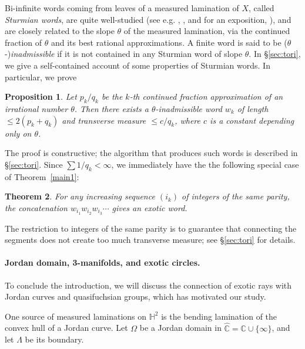 \documentclass[11pt]{article} %
\theoremstyle{plain}
\newtheorem{thm}{Theorem}[section]
\newtheorem{prop}[thm]{Proposition}
\theoremstyle{definition}
\numberwithin{equation}{section}
\begin{document}
Bi-infinite words coming from leaves of a measured lamination of $X$, called \emph{Sturmian words}, are quite well-studied (see e.g. \cite{sturmian1}, \cite{sturmian2}, and for an exposition, \cite{sturmian}), and are closely related to the slope $\theta$ of the measured lamination, via the continued fraction of $\theta$ and its best rational approximations. A finite word is said to be ($\theta$-)\emph{inadmissible} if it is not contained in any Sturmian word of slope $\theta$. In \S\ref{sec:tori}, we give a self-contained account of some properties of Sturmian words. In particular, we prove
\begin{prop}\label{prop:tori}
Let $p_k/q_k$ be the $k$-th continued fraction approximation of an irrational number $\theta$. Then there exists a $\theta$-inadmissible word $w_k$ of length $\le2(p_k+q_k)$ and transverse measure $\leq c/q_k$, where $c$ is a constant depending only on $\theta$.
\end{prop}
The proof is constructive; the algorithm that produces such words is described in \S\ref{sec:tori}. Since $\sum 1/q_k<\infty$, we immediately have the the following special case of Theorem~\ref{main1}:
\begin{thm}\label{thm:tori}
For any increasing sequence $(i_k)$ of integers of the same parity, the concatenation $w_{i_1}w_{i_2}w_{i_3}\cdots$ gives an exotic word.
\end{thm}
The restriction to integers of the same parity is to guarantee that connecting the segments does not create too much transverse measure; see \S\ref{sec:tori} for details.

\paragraph{Jordan domain, 3-manifolds, and exotic circles.}
To conclude the introduction, we will discuss the connection of exotic rays with Jordan curves and quasifuchsian groups, which has motivated our study.

One source of measured laminations on $\mathbb{H}^2$ is the bending lamination of the convex hull of a Jordan curve. Let $\Omega$ be a Jordan domain in $\hat{\mathbb{C}}=\mathbb{C}\cup\{\infty\}$, and let $\Lambda$ be its boundary.
\end{document}

